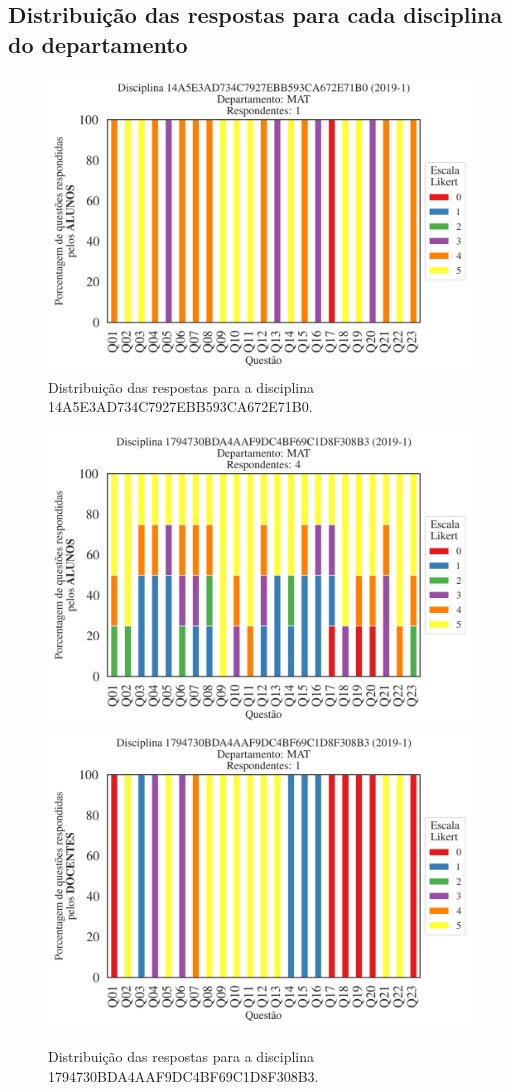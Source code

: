 \documentclass[a4paper,10pt]{article}
\begin{document}
\subsection{Distribuição das respostas para cada disciplina do departamento}
\begin{figure}[h]
\centering
\includegraphics[width=0.485\linewidth]{analise_disciplina_departamento_MAT_ALUNO_TURMA_14A5E3AD734C7927EBB593CA672E71B0.png}
\caption{\label{fig:analise_geral_departamento}                Distribuição das respostas para a disciplina 14A5E3AD734C7927EBB593CA672E71B0.}
\end{figure}
\begin{figure}[h]
\centering
\includegraphics[width=0.485\linewidth]{analise_disciplina_departamento_MAT_ALUNO_TURMA_1794730BDA4AAF9DC4BF69C1D8F308B3.png}
\includegraphics[width=0.485\linewidth]{analise_disciplina_departamento_MAT_DOCENTE_TURMA_1794730BDA4AAF9DC4BF69C1D8F308B3.png}
\caption{\label{fig:analise_geral_departamento}                Distribuição das respostas para a disciplina 1794730BDA4AAF9DC4BF69C1D8F308B3.}
\end{figure}
\end{document}
